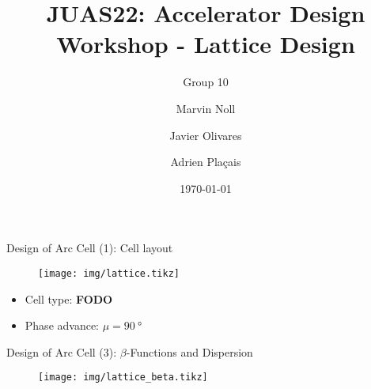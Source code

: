 \documentclass{beamer}
\title[Topic III: Lattice Design]{JUAS22: Accelerator Design Workshop - Lattice Design}
\subtitle{Group 10}
\author[Noll, Olivares, Plaçais]{Marvin Noll \and Javier Olivares \and Adrien Plaçais}
\date[\today]{\today}
\begin{document}
\begin{frame}[plain]
  \titlepage
\end{frame}

\begin{frame}[t,fragile]{Design of Arc Cell (1): Cell layout}
\begin{figure}
\centering
\texttt{[image: img/lattice.tikz]}
\end{figure}
\begin{itemize}
\item Cell type: \textbf{FODO}
\item Phase advance: $\mu=\SI{90}{\degree}$
\end{itemize}
\end{frame}

%
\begin{frame}[t,fragile]{Design of Arc Cell (3): $\beta$-Functions and Dispersion}
\begin{figure}
\centering
\texttt{[image: img/lattice\_beta.tikz]}
\end{figure}
\end{frame}
%
%
\end{document}
